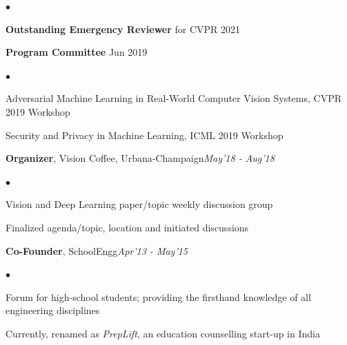 \documentclass[margin,line]{res}
\newenvironment{list2}{
  \begin{list}{$\bullet$}{%
      \setlength{\itemsep}{0in}
      \setlength{\parsep}{0in} \setlength{\parskip}{0in}
      \setlength{\topsep}{0in} \setlength{\partopsep}{0in} 
      \setlength{\leftmargin}{0.2in}}}{\end{list}}
\begin{document}
\begin{resume}
\begin{list2}
\item {\bf Outstanding Emergency Reviewer} for CVPR 2021
\end{list2}\vspace*{-0.05in} 
{\bf Program Committee} {\hfill Jun 2019}\vspace*{-0.15in}\\
\begin{list2}
\item Adversarial Machine Learning in Real-World Computer Vision Systems, CVPR 2019 Workshop
\item Security and Privacy in Machine Learning, ICML 2019 Workshop
\end{list2}\vspace*{-0.05in} 
{\bf Organizer}, Vision Coffee, Urbana-Champaign{\hfill \em May'18 - Aug'18}\vspace*{-0.15in}\\
\begin{list2}
\item Vision and Deep Learning paper/topic weekly discussion group
\item Finalized agenda/topic, location and initiated discussions 
\end{list2}\vspace*{-0.05in} 
{\bf Co-Founder}, SchoolEngg{\hfill \em Apr'13 - May'15}\vspace*{-0.15in}\\
\begin{list2}
\item Forum for high-school students; providing the firsthand knowledge of all engineering disciplines
\item Currently, renamed as {\em PrepLift}, an education counselling start-up in India
\end{list2}\vspace*{-0.05in} 

\end{resume}
\end{document}
